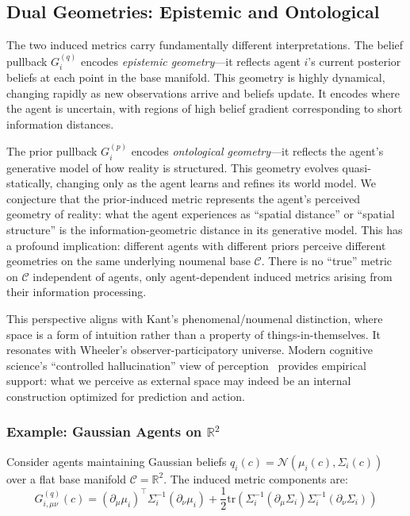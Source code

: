 \documentclass[11pt]{article}
\begin{document}
\subsection{Dual Geometries: Epistemic and Ontological}

The two induced metrics carry fundamentally different interpretations. The belief pullback $G_i^{(q)}$ encodes \emph{epistemic geometry}---it reflects agent $i$'s current posterior beliefs at each point in the base manifold. This geometry is highly dynamical, changing rapidly as new observations arrive and beliefs update. It encodes where the agent is uncertain, with regions of high belief gradient corresponding to short information distances.

The prior pullback $G_i^{(p)}$ encodes \emph{ontological geometry}---it reflects the agent's generative model of how reality is structured. This geometry evolves quasi-statically, changing only as the agent learns and refines its world model. We conjecture that the prior-induced metric represents the agent's perceived geometry of reality: what the agent experiences as ``spatial distance'' or ``spatial structure'' is the information-geometric distance in its generative model. This has a profound implication: different agents with different priors perceive different geometries on the same underlying noumenal base $\mathcal{C}$. There is no ``true'' metric on $\mathcal{C}$ independent of agents, only agent-dependent induced metrics arising from their information processing.

This perspective aligns with Kant's phenomenal/noumenal distinction, where space is a form of intuition rather than a property of things-in-themselves. It resonates with Wheeler's observer-participatory universe. Modern cognitive science's ``controlled hallucination'' view of perception~\cite{Clark2016,Hoffman2019} provides empirical support: what we perceive as external space may indeed be an internal construction optimized for prediction and action.

\subsubsection{Example: Gaussian Agents on $\mathbb{R}^2$}

Consider agents maintaining Gaussian beliefs $q_i(c) = \mathcal{N}(\mu_i(c), \Sigma_i(c))$ over a flat base manifold $\mathcal{C} = \mathbb{R}^2$. The induced metric components are:
\begin{equation}
G^{(q)}_{i,\mu\nu}(c) = (\partial_\mu \mu_i)^\top \Sigma_i^{-1} (\partial_\nu \mu_i) + \frac{1}{2}\mathrm{tr}\left(\Sigma_i^{-1}(\partial_\mu \Sigma_i)\Sigma_i^{-1}(\partial_\nu \Sigma_i)\right)
\end{equation}
\end{document}
